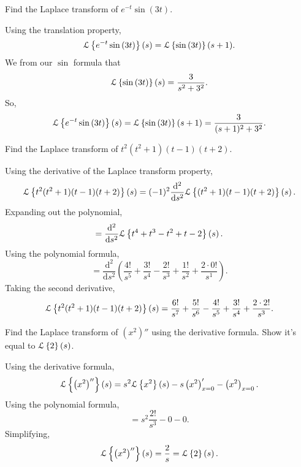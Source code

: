 \begin{example}
	Find the Laplace transform of $e^{-t}\sin{(3t)}$.
\end{example}
\noindent
Using the translation property,
\begin{equation*}
	\mathcal{L}\left\{ e^{-t}\sin{(3t)} \right\}\left(s\right) = \mathcal{L}\left\{\sin{(3t)}\right\}(s+1).
\end{equation*}
We from our $\sin$ formula that
\begin{equation*}
	\mathcal{L}\left\{ \sin{(3t)} \right\}\left(s\right) = \frac{3}{s^2 + 3^2}.
\end{equation*}
So,
\begin{equation*}
	\mathcal{L}\left\{ e^{-t}\sin{(3t)} \right\}\left(s\right) = \mathcal{L}\left\{\sin{(3t)}\right\}(s+1) = \frac{3}{(s+1)^2 + 3^2}.
\end{equation*}

\begin{example}
	Find the Laplace transform of $t^2(t^2 + 1)(t - 1)(t + 2)$.
\end{example}
\noindent
Using the derivative of the Laplace transform property,
\begin{equation*}
	\mathcal{L}\left\{ t^2(t^2 + 1)(t - 1)(t + 2) \right\}\left(s\right) = (-1)^2\frac{\mathrm{d}^2}{\mathrm{d}s^2}\mathcal{L}\left\{ (t^2 + 1)(t - 1)(t + 2) \right\}\left(s\right).
\end{equation*}
Expanding out the polynomial,
\begin{equation*}
	 = \frac{\mathrm{d}^2}{\mathrm{d}s^2}\mathcal{L}\left\{ t^4 + t^3 - t^2 + t - 2 \right\}\left(s\right).
\end{equation*}
Using the polynomial formula,
\begin{equation*}
	 = \frac{\mathrm{d}^2}{\mathrm{d}s^2}\left(\frac{4!}{s^5} + \frac{3!}{s^4} - \frac{2!}{s^3} + \frac{1!}{s^2} + \frac{2\cdot 0!}{s^1}\right).
\end{equation*}
Taking the second derivative,
\begin{equation*}
	 \mathcal{L}\left\{ t^2(t^2 + 1)(t - 1)(t + 2) \right\}\left(s\right) = \frac{6!}{s^7} + \frac{5!}{s^6} - \frac{4!}{s^5} + \frac{3!}{s^4} + \frac{2\cdot 2!}{s^3}.
\end{equation*}

\begin{example}
	Find the Laplace transform of $\left(x^2\right)''$ using the derivative formula. Show it's equal to $\mathcal{L}\left\{ 2 \right\}\left(s\right)$.
\end{example}
\noindent
Using the derivative formula,
\begin{equation*}
	\mathcal{L}\left\{ \left(x^2\right)'' \right\}\left(s\right) = s^2\mathcal{L}\left\{ x^2 \right\}\left(s\right) - s\left(x^2\right)'_{x=0} - \left(x^2\right)_{x=0}.
\end{equation*}
Using the polynomial formula,
\begin{equation*}
 	= s^2\frac{2!}{s^3} - 0 - 0.
\end{equation*}
Simplifying,
\begin{equation*}
	\mathcal{L}\left\{ \left(x^2\right)'' \right\}\left(s\right) = \frac{2}{s} = \mathcal{L}\left\{ 2 \right\}\left(s\right).
\end{equation*}

